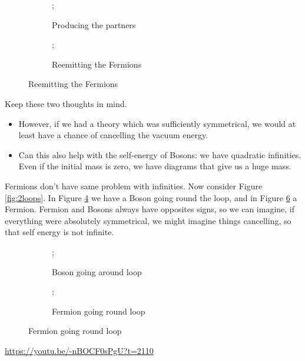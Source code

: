 \documentclass[]{article}
\begin{document}
\begin{figure}[H]
	\begin{center}
		\caption{Why there isn't a Boson equivalent to the electron}
		\begin{subfigure}{0.45\textwidth}
			\caption{Producing the partners}\label{fig:partners}
			;
		\end{subfigure}
		\begin{subfigure}{0.45\textwidth}
			\caption{Reemitting the Fermions}\label{fig:re:emit}
			;
		\end{subfigure}
	\end{center}
\end{figure}

 Keep these two thoughts in mind.
\begin{itemize}
	\item  However, if we had a theory which was sufficiently symmetrical, we would at least have a chance of cancelling the vacuum energy.
	\item Can this also help with the self-energy of Bosons: we have quadratic infinities. Even if the initial mass is zero, we have diagrams that give us a huge mass.
\end{itemize}

Fermions don't have same problem with infinities. Now consider Figure \ref{fig:2loops}. In Figure \ref{fig:2loops:bosons} we have a Boson going round the loop, and in Figure \ref{fig:2loops:fermions} a Fermion. Fermion and Bosons always have opposites signs, so we can imagine, if everything were absolutely symmetrical, we might imagine things cancelling, so that self energy is not infinite.

\begin{figure}[H]
	\caption{Two loops for a boson}\label{fig:2loops}
	\begin{subfigure}{0.45\textwidth}
		\caption{Boson going around loop}\label{fig:2loops:bosons}
		;
	\end{subfigure}
	\begin{subfigure}{0.45\textwidth}
		\caption{Fermion going round loop}\label{fig:2loops:fermions}
		;
	\end{subfigure}
\end{figure}
\url{https://youtu.be/-nBOCF0sPgU?t=2110}
\end{document}
